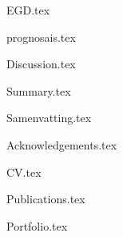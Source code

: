 \documentclass[10pt,twoside,openright]{memoir}
\begin{document}
{EGD.tex}
\clearemptydoublepage


{prognosais.tex}
\clearemptydoublepage

{Discussion.tex}
\clearemptydoublepage

\backmatter
\thumbfalse
{Summary.tex}
\clearemptydoublepage

{Samenvatting.tex}
\clearemptydoublepage

{Acknowledgements.tex}
\clearemptydoublepage

{CV.tex}
\clearemptydoublepage

{Publications.tex}
\clearemptydoublepage

{Portfolio.tex}
\clearemptydoublepage

\printglossary[type=main]
\printglossary[type=\acronymtype]
\clearemptydoublepage

\newrefcontext[sorting=none]
\printbibliography[heading=bibintoc]
\end{document}
